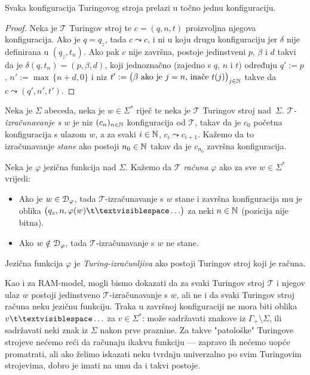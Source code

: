\begin{lema}[{name=[determinističnost Turingovih strojeva]}]\label{lm:Turingdet}
Svaka konfiguracija Turingovog stroja prelazi u točno jednu konfiguraciju.%
\end{lema}
\begin{proof}
	Neka je $\mathcal T$ Turingov stroj te $c=(q,n,t)$ proizvoljna njegova konfiguracija. Ako je $q=q_z$, tada $c\leadsto c$, i ni u koju drugu konfiguraciju jer $\delta$ nije definirana u $(q_z,t_n)$. Ako pak $c$ nije završna, postoje jedinstveni $p$, $\beta$ i $d$ takvi da je $\delta(q,t_n)=(p,\beta,d)$, koji jednoznačno (zajedno s $q$, $n$ i $t$) određuju $q':=p$, $n':=\max\,\{n+d,0\}$ i niz $t':=\bigl(\text{$\beta$ ako je $j=n$, inače $t(j)$}\bigl)_{j\in{\mathbb N}}$ takve da $c\leadsto(q',n',t')$.
\end{proof}

\begin{definicija}[{name=[Turing-izračunljiva jezična funkcija]}]\label{def:Tcomputefi}
Neka je $\Sigma$ abeceda, neka je $w\in\Sigma^*$ riječ te neka je $\mathcal T$ Turingov stroj nad~$\Sigma$. \emph{$\mathcal T$\!-izračunavanje s $w$} je niz $(c_n)_{n\in{\mathbb N}}$ konfiguracija od $\mathcal T$, takav da je $c_0$ početna konfiguracija s ulazom $w$, a za svaki $i\in{\mathbb N}$, $c_i\leadsto c_{i+1}$. Kažemo da to izračunavanje \emph{stane} ako postoji $n_0\in{\mathbb N}$ takav da je $c_{n_0}$ završna konfiguracija.

Neka je $\varphi$ jezična funkcija nad $\Sigma$. Kažemo da $\mathcal T$ \emph{računa} $\varphi$ ako za sve $w\in\Sigma^*$ vrijedi:
\begin{itemize}
    \item Ako je $w\in\mathcal D_{\varphi}$, tada $\mathcal T$\!-izračunavanje s $w$ stane i završna konfiguracija mu je oblika $\bigl(q_z,n,\varphi(w)\bl\ldots\bigr)$ za neki $n\in{\mathbb N}$ (pozicija nije bitna).
    \item Ako $w\notin\mathcal D_{\varphi}$, tada $\mathcal T$\!-izračunavanje s $w$ ne stane.
\end{itemize}
Jezična funkcija $\varphi$ je \emph{Turing-izračunljiva} ako postoji Turingov stroj koji je računa.
\end{definicija}

Kao i za RAM-model, mogli bismo dokazati da za svaki Turingov stroj $\mathcal T$ i njegov ulaz $w$ postoji jedinstveno $\mathcal T$\!-izračunavanje s $w$, ali ne i da svaki Turingov stroj računa neku jezičnu funkciju. Traka u završnoj konfiguraciji ne mora biti oblika $v\bl\ldots$ za $v\in\Sigma^*$: može sadržavati znakove iz $\Gamma_+\!\setminus\Sigma$, ili sadržavati neki znak iz $\Sigma$ nakon prve praznine. Za takve "patološke" Turingove strojeve nećemo reći da računaju ikakvu funkciju --- zapravo ih nećemo uopće promatrati, ali ako želimo iskazati neku tvrdnju univerzalno po svim Turingovim strojevima, dobro je imati na umu da i takvi postoje.

